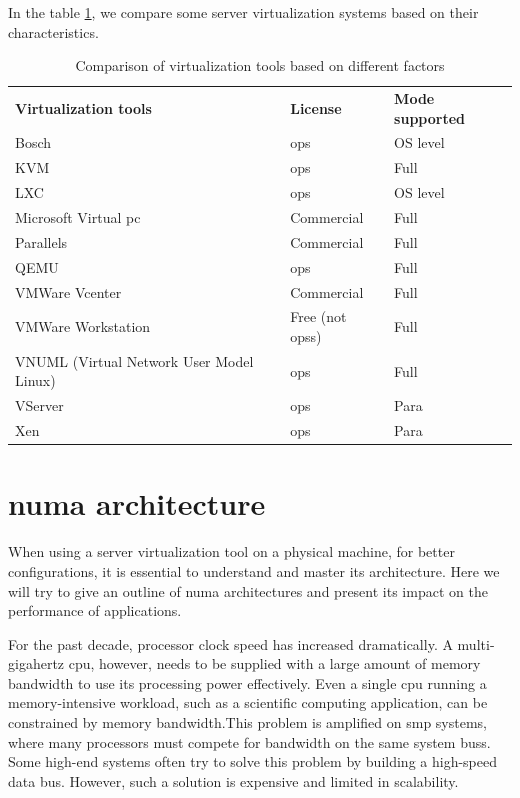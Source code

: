 In the table \ref{table:virtualtools}, we compare some server virtualization systems based on their characteristics. 

\begin{table}[!h]
    \centering
    \caption{Comparison of virtualization tools based on different factors}
    \begin{tabular}{p{5cm}>{\centering\arraybackslash}p{4cm}>{\centering\arraybackslash}p{4cm}}
     \toprule
     \textbf{Virtualization tools} & \textbf{License} & \textbf{Mode supported} \\
     \myrowcolour
     Bosch &  \gls{ops} & OS level \\
     KVM & \gls{ops} & Full \\
     \myrowcolour
     LXC & \gls{ops} & OS level \\
     Microsoft Virtual \acrshort{pc} & Commercial & Full \\
     \myrowcolour
     Parallels & Commercial & Full \\
     QEMU & \gls{ops} & Full \\
     \myrowcolour
     VMWare Vcenter & Commercial & Full \\
     VMWare Workstation & Free (not \glspl{ops}) & Full \\
     \myrowcolour
     VNUML (Virtual Network User Model Linux) & \gls{ops} & Full \\
     VServer & \gls{ops} & Para \\
     \myrowcolour
     Xen & \gls{ops} & Para \\
 
     \bottomrule
    \end{tabular}
    \label{table:virtualtools}
\end{table}

\section{\acrshort{numa} architecture}
 When using a server virtualization tool on a physical machine, for better configurations, it is essential to understand and master its architecture. Here we will try to give an outline of \acrshort{numa} architectures and present its impact on the performance of applications.
 
\par For the past decade, processor clock speed has increased dramatically. A multi-gigahertz \acrshort{cpu}, however, needs to be supplied with a large amount of memory bandwidth to use its processing power effectively. Even a single \acrshort{cpu} running a memory-intensive workload, such as a scientific computing application, can be constrained by memory bandwidth.This problem is amplified on \acrshort{smp} systems, where many processors must compete for bandwidth on the same system \glspl{bus}. Some high-end systems often try to solve this problem by building a high-speed data bus. However, such a solution is expensive and limited in scalability.

